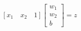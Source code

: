 \documentclass[preview]{standalone}
\begin{document}
\begin{align*}
\left[ x_1 \quad x_2 \quad 1 \right] \begin{bmatrix} w_1 \\ w_2 \\ b \end{bmatrix} = z
\end{align*}
\end{document}
